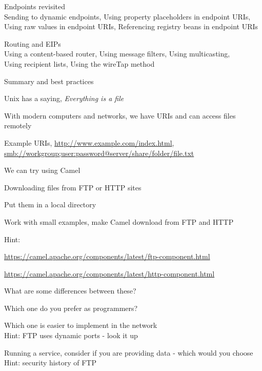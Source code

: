 \documentclass[Screen16to9,17pt]{foils}
\begin{document}

\begin{list2}
\item Endpoints revisited\\
Sending to dynamic endpoints, Using property placeholders
in endpoint URIs,\\
 Using raw values in endpoint
URIs, Referencing registry beans in endpoint URIs
\item Routing and EIPs\\
Using a content-based router, Using message
filters, Using multicasting,\\
Using recipient
lists, Using the wireTap method
\item Summary and best practices
\end{list2}



\begin{list2}
\item Unix has a saying, \emph{Everything is a file}
\item With modern computers and networks, we have URIs and can access files remotely
\item Example URIs, \url{http://www.example.com/index.html},\\ \url{smb://workgroup;user:password@server/share/folder/file.txt}
\end{list2}



We can try using Camel
\begin{list2}
\item Downloading files from FTP or HTTP sites
\item Put them in a local directory
\item Work with small examples, make Camel download from FTP and HTTP
\item Hint:
\item \url{https://camel.apache.org/components/latest/ftp-component.html}
\item \url{https://camel.apache.org/components/latest/http-component.html}
\end{list2}




\begin{list2}
\item What are some differences between these?
\item Which one do you prefer as programmers?
\item Which one is easier to implement in the network\\
Hint: FTP uses dynamic ports - look it up
\item Running a service, consider if you are providing data - which would you choose\\
Hint: security history of FTP
\end{list2}
\end{document}
